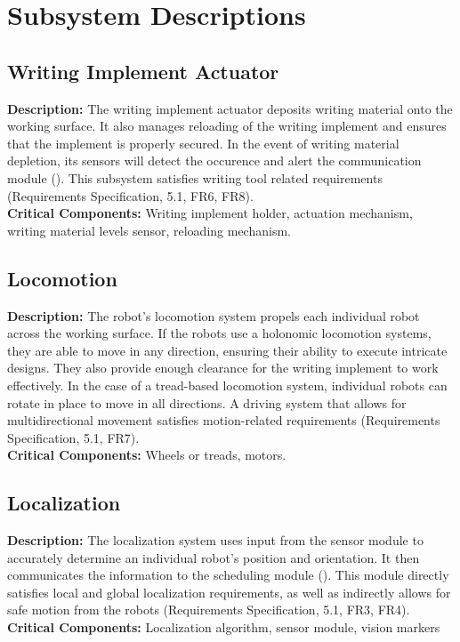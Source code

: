 
\section{Subsystem Descriptions}
\label{sec:subsystem_descriptions}



\subsection{Writing Implement Actuator}
\label{sec:subsystem_writing_implement_actuator}
\textbf{Description:} The writing implement actuator deposits writing material onto the working surface. It also manages reloading of the writing implement and ensures that the implement is properly secured. In the event of writing material depletion, its sensors will detect the occurence and alert the communication module (). This subsystem satisfies writing tool related requirements (Requirements Specification, 5.1, FR6, FR8).\\
\textbf{Critical Components:} Writing implement holder, actuation mechanism, writing material levels sensor, reloading mechanism.\\

\subsection{Locomotion}
\label{sec:subsystem_locomotion}
\textbf{Description:} The robot's locomotion system propels each individual robot across the working surface. If the robots use a holonomic locomotion systems, they are able to move in any direction, ensuring their ability to execute intricate designs. They also provide enough clearance for the writing implement to work effectively. In the case of a tread-based locomotion system, individual robots can rotate in place to move in all directions. A driving system that allows for multidirectional movement satisfies motion-related requirements (Requirements Specification, 5.1, FR7).\\
\textbf{Critical Components:} Wheels or treads, motors.\\

\subsection{Localization}
\label{sec:subsystem_localization}
\textbf{Description:} The localization system uses input from the sensor module to accurately determine an individual robot's position and orientation. It then communicates the information to the scheduling module (). This module directly satisfies local and global localization requirements, as well as indirectly allows for safe motion from the robots (Requirements Specification, 5.1, FR3, FR4).
\textbf{Critical Components:} Localization algorithm, sensor module, vision markers

